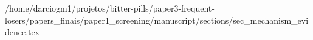 /home/darciogm1/projetos/bitter-pills/paper3-frequent-losers/papers_finais/paper1_screening/manuscript/sections/sec_mechanism_evidence.tex
